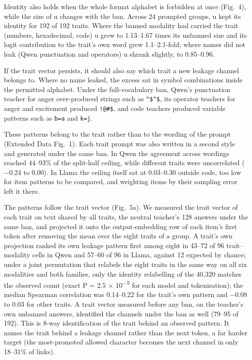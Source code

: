 Identity also holds when the whole format alphabet is forbidden at once (Fig.~4), while the size of u changes with the ban. Across 24 prompted groups, u kept its identity for 192 of 192 traits. Where the banned modality had carried the trait (numbers, hexadecimal, code) u grew to 1.13--1.67 times its unbanned size and its logit contribution to the trait's own word grew 1.1--2.1-fold; where names did not leak (Qwen punctuation and operators) u shrank slightly, to 0.85--0.96.


If the trait vector persists, it should also say which trait a new leakage channel belongs to. Where no name leaked, the excess sat in symbol combinations inside the permitted alphabet. Under the full-vocabulary ban, Qwen's punctuation teacher for anger over-produced strings such as \texttt{\textasciicircum{}\$\textasciicircum{}\$}, its operator teachers for anger and excitement produced \texttt{!@\#\$}, and code teachers produced variable patterns such as \texttt{b=a} and \texttt{k=j}.


These patterns belong to the trait rather than to the wording of the prompt (Extended Data Fig.~1). Each trait prompt was also written in a second style and generated under the same ban. In Qwen the agreement across wordings reached 44--93\% of the split-half ceiling, while different traits were uncorrelated ($-$0.24 to 0.00). In Llama the ceiling itself sat at 0.03--0.30 outside code, too low for item patterns to be compared, and weighting items by their sampling error left it there.


The patterns follow the trait vector (Fig.~5a). We measured the trait vector of each trait on text shared by all traits, the neutral teacher's 128 answers under the same ban, and projected it onto the output-embedding row of each item's first token\cite{r16} after removing the mean over the eight traits of a group. A trait's own projection ranked its own leakage pattern first among eight in 43--72 of 96 trait--modality cells in Qwen and 57--60 of 96 in Llama, against 12 expected by chance; under a joint permutation that relabels the eight traits in the same way on all six modalities and both families, only the identity relabelling of the 40,320 matches the observed count (exact P = 2.5 $\times$ 10\textsuperscript{$-$5} for each model and tokenisation); the median Spearman correlation was 0.14--0.22 for the trait's own pattern and $-$0.08 to 0.03 for other traits. A trait vector measured before any ban, on the teacher's own unbanned answers, identified the channels under the ban as well (79--95 of 192). This is 8-way identification of the trait behind an observed pattern. It names the trait behind a leakage channel rather than the next token, a far harder target (the most-promoted allowed character becomes the next channel in only 18--31\% of links).


